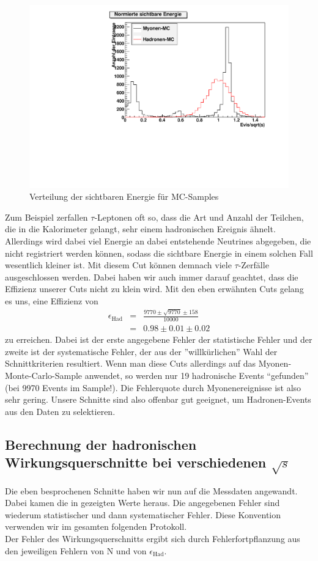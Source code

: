 \begin{figure}[htb]
	\centering
	\includegraphics[width=1\columnwidth,keepaspectratio]{Evisvgl_mc.pdf}
	\caption{Verteilung der sichtbaren Energie für MC-Samples}
	\label{fig:Evisvgl_mc}
\end{figure}
Zum Beispiel zerfallen $\tau$-Leptonen oft so, dass die Art und Anzahl der Teilchen, die in die Kalorimeter gelangt, sehr einem hadronischen Ereignis ähnelt. Allerdings wird dabei viel Energie an dabei entstehende Neutrines abgegeben, die nicht registriert werden können, sodass die sichtbare Energie in einem solchen Fall wesentlich kleiner ist. Mit diesem Cut können demnach viele $\tau$-Zerfälle ausgeschlossen werden. Dabei haben wir auch immer darauf geachtet, dass die Effizienz unserer Cuts nicht zu klein wird. Mit den eben erwähnten Cuts gelang es uns, eine Effizienz von
\begin{eqnarray}
\epsilon_\mathrm{Had} &=& \frac{9770 \pm \sqrt{9770} \pm 158}{10000}\\
&=& 0.98 \pm 0.01 \pm 0.02
\end{eqnarray}
zu erreichen. Dabei ist der erste angegebene Fehler der statistische Fehler und der zweite ist der systematische Fehler, der aus der ''willkürlichen'' Wahl der Schnittkriterien resultiert. Wenn man diese Cuts allerdings auf das Myonen-Monte-Carlo-Sample anwendet, so werden nur 19 hadronische Events ``gefunden'' (bei 9970 Events im Sample!). Die Fehlerquote durch Myonenereignisse ist also sehr gering. Unsere Schnitte sind also offenbar gut geeignet, um Hadronen-Events aus den Daten zu selektieren.

\subsection{Berechnung der hadronischen Wirkungsquerschnitte bei verschiedenen $\sqrt{s}$}
Die eben besprochenen Schnitte haben wir nun auf die Messdaten angewandt. Dabei kamen die in  gezeigten Werte heraus. Die angegebenen Fehler sind wiederum statistischer und dann systematischer Fehler. Diese Konvention verwenden wir im gesamten folgenden Protokoll.\\
Der Fehler des Wirkungsquerschnitts ergibt sich durch Fehlerfortpflanzung aus den jeweiligen Fehlern von N und von $\epsilon_\mathrm{Had}$.

